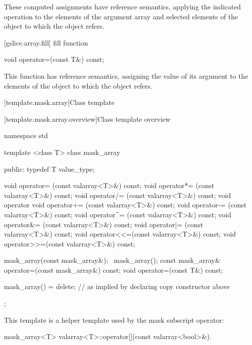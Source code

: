 \begin{itemdescr}
\pnum
These computed assignments have reference semantics, applying the
indicated operation to the elements of the argument array and selected
elements of the
object to which the
object refers.
\end{itemdescr}

[gslice.array.fill]{ fill function}

%
\begin{itemdecl}
void operator=(const T&) const;
\end{itemdecl}

\begin{itemdescr}
\pnum
This function has reference semantics, assigning the value of its argument
to the elements of the
object to which the
object refers.
\end{itemdescr}

[template.mask.array]{Class template }

[template.mask.array.overview]{Class template  overview}

%
\begin{codeblock}
namespace std {
  template <class T> class mask_array {
  public:
    typedef T value_type;

    void operator=  (const valarray<T>&) const;
    void operator*= (const valarray<T>&) const;
    void operator/= (const valarray<T>&) const;
    void operator%
    void operator+= (const valarray<T>&) const;
    void operator-= (const valarray<T>&) const;
    void operator^= (const valarray<T>&) const;
    void operator&= (const valarray<T>&) const;
    void operator|= (const valarray<T>&) const;
    void operator<<=(const valarray<T>&) const;
    void operator>>=(const valarray<T>&) const;

    mask_array(const mask_array&);
   ~mask_array();
    const mask_array& operator=(const mask_array&) const;
    void operator=(const T&) const;

    mask_array() = delete;        // as implied by declaring copy constructor above
  };
}
\end{codeblock}

\pnum
This template is a helper template used by the mask subscript operator:

%
%
\begin{itemdecl}
mask_array<T> valarray<T>::operator[](const valarray<bool>&).
\end{itemdecl}

